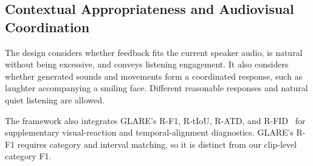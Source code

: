 \subsection{Contextual Appropriateness and Audiovisual Coordination}
The design considers whether feedback fits the current speaker audio, is natural without being excessive, and conveys listening engagement. It also considers whether generated sounds and movements form a coordinated response, such as laughter accompanying a smiling face. Different reasonable responses and natural quiet listening are allowed.

The framework also integrates GLARE's R-F1, R-tIoU, R-ATD, and R-FID~\cite{glare} for supplementary visual-reaction and temporal-alignment diagnostics. GLARE's R-F1 requires category and interval matching, so it is distinct from our clip-level category F1.
